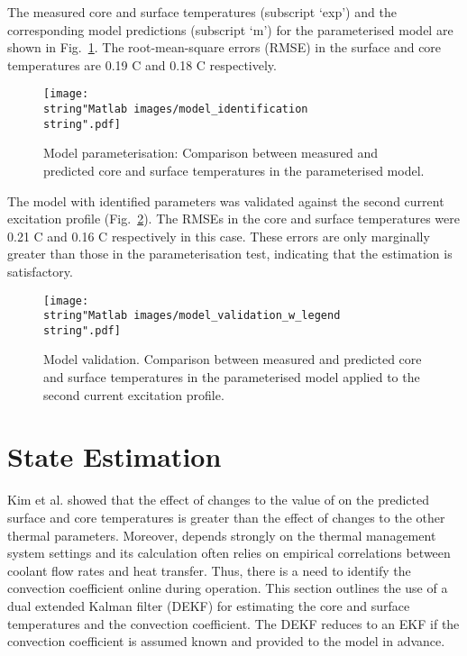 \documentclass[journal, english]{IEEEtran}
\begin{document}
The measured core and surface temperatures (subscript `exp') and the corresponding model predictions (subscript `m') for the parameterised model are shown in Fig.\ \ref{fig:Parameterisation}.
The root-mean-square errors (RMSE) in the surface and core temperatures are 0.19 C
and 0.18 C respectively. 
\begin{figure}[h]
\begin{centering}
\texttt{[image: \\string"Matlab images/model\_identification\\string".pdf]}
\par\end{centering}
\caption{Model parameterisation: Comparison between measured and predicted
core and surface temperatures in the parameterised model.\label{fig:Parameterisation}}
\end{figure}

The model with identified parameters was validated against the second
current excitation profile (Fig.\ \ref{fig:Validation}). The RMSEs in the core and surface temperatures were 0.21 C
and 0.16 C respectively in this case. These errors are only
marginally greater than those in the parameterisation test, indicating
that the estimation is satisfactory.
\begin{figure}[h]
\begin{centering}
\texttt{[image: \\string"Matlab images/model\_validation\_w\_legend\\string".pdf]}
\par\end{centering}
\caption{Model validation. Comparison between measured and predicted core and
surface temperatures in the parameterised model applied to the second
current excitation profile.\label{fig:Validation}}
\end{figure}

\section{State Estimation}
Kim et al. \cite{Kim2013} showed that the effect of changes to the
value of  on the predicted surface and core temperatures is greater
than the effect of changes to the other thermal parameters. Moreover,  depends strongly on the thermal
management system settings and its calculation often relies on empirical
correlations between coolant flow rates and heat transfer. Thus, there
is a need to identify the convection coefficient online during operation.
This section outlines the use of a dual extended Kalman filter (DEKF) \cite{Wan2001}
for estimating the core and surface temperatures and the convection
coefficient. The DEKF reduces to an EKF if the convection coefficient
is assumed known and provided to the model in advance.
\end{document}
